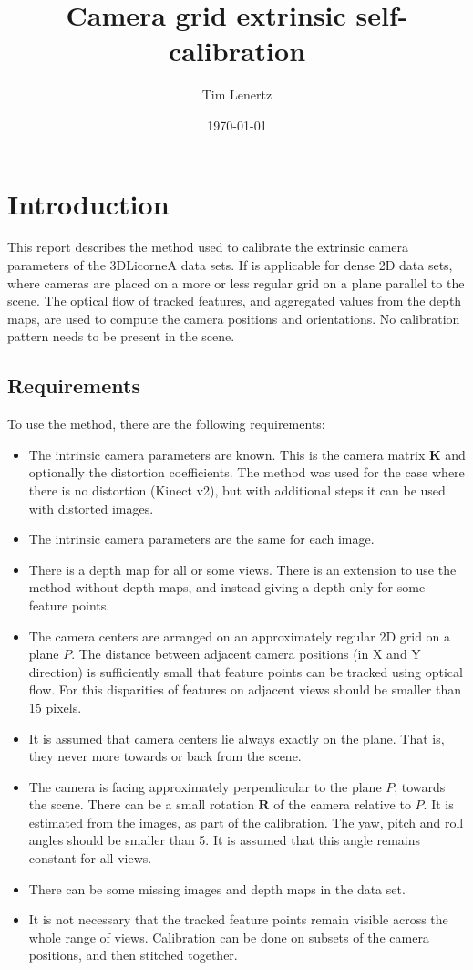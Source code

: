 \documentclass{scrreprt}
\title{Camera grid extrinsic self-calibration}
\author{Tim Lenertz}
\date{\today}
\newcommand{\matr}[1]{\mathbf{#1}}
\begin{document}
\maketitle

\tableofcontents

\chapter{Introduction}
This report describes the method used to calibrate the extrinsic camera parameters of the 3DLicorneA data sets. If is applicable for dense 2D data sets, where cameras are placed on a more or less regular grid on a plane parallel to the scene. The optical flow of tracked features, and aggregated values from the depth maps, are used to compute the camera positions and orientations. No calibration pattern needs to be present in the scene.

\section{Requirements}
To use the method, there are the following requirements:
\begin{itemize}
\item The intrinsic camera parameters are known. This is the camera matrix $\matr{K}$ and optionally the distortion coefficients. The method was used for the case where there is no distortion (Kinect v2), but with additional steps it can be used with distorted images.
\item The intrinsic camera parameters are the same for each image.
\item There is a depth map for all or some views. There is an extension to use the method without depth maps, and instead giving a depth only for some feature points.
\item The camera centers are arranged on an approximately regular 2D grid on a plane $P$. The distance between adjacent camera positions (in X and Y direction) is sufficiently small that feature points can be tracked using optical flow. For this disparities of features on adjacent views should be smaller than 15 pixels.
\item It is assumed that camera centers lie always exactly on the plane. That is, they never more towards or back from the scene. 
\item The camera is facing approximately perpendicular to the plane $P$, towards the scene. There can be a small rotation $\matr{R}$ of the camera relative to $P$. It is estimated from the images, as part of the calibration. The yaw, pitch and roll angles should be smaller than 5\textdegree. It is assumed that this angle remains constant for all views.
\item There can be some missing images and depth maps in the data set.
\item It is not necessary that the tracked feature points remain visible across the whole range of views. Calibration can be done on subsets of the camera positions, and then stitched together.
\end{itemize}
\end{document}
